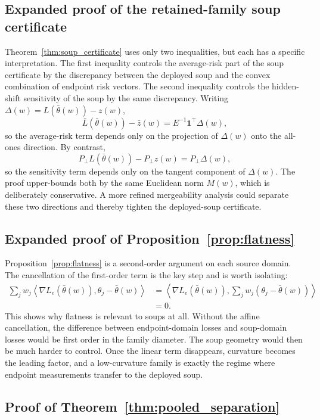 \documentclass{article}
\theoremstyle{definition}
\newcommand{\one}{\mathbf{1}}
\newcommand{\inner}[2]{\left\langle #1, #2 \right\rangle}
\newcommand{\thetaw}{\bar{\theta}(w)}
\begin{document}
\subsection{Expanded proof of the retained-family soup certificate}

Theorem~\ref{thm:soup_certificate} uses only two inequalities, but each has a specific interpretation. The first inequality controls the average-risk part of the soup certificate by the discrepancy between the deployed soup and the convex combination of endpoint risk vectors. The second inequality controls the hidden-shift sensitivity of the soup by the same discrepancy. Writing \(\Delta(w)=L(\thetaw)-z(w)\),
\[
\bar L(\thetaw)-\bar z(w)=E^{-1}\one^\top\Delta(w),
\]
so the average-risk term depends only on the projection of \(\Delta(w)\) onto the all-ones direction. By contrast,
\[
P_\perp L(\thetaw)-P_\perp z(w)=P_\perp\Delta(w),
\]
so the sensitivity term depends only on the tangent component of \(\Delta(w)\). The proof upper-bounds both by the same Euclidean norm \(M(w)\), which is deliberately conservative. A more refined mergeability analysis could separate these two directions and thereby tighten the deployed-soup certificate.

\subsection{Expanded proof of Proposition~\ref{prop:flatness}}

Proposition~\ref{prop:flatness} is a second-order argument on each source domain. The cancellation of the first-order term is the key step and is worth isolating:
\[
\begin{aligned}
\sum_j w_j \inner{\nabla L_e(\thetaw)}{\theta_j-\thetaw}
&=
\inner{\nabla L_e(\thetaw)}{\sum_j w_j(\theta_j-\thetaw)} \\
&= 0.
\end{aligned}
\]
This shows why flatness is relevant to soups at all. Without the affine cancellation, the difference between endpoint-domain losses and soup-domain losses would be first order in the family diameter. The soup geometry would then be much harder to control. Once the linear term disappears, curvature becomes the leading factor, and a low-curvature family is exactly the regime where endpoint measurements transfer to the deployed soup.

\subsection{Proof of Theorem~\ref{thm:pooled_separation}}
\end{document}
